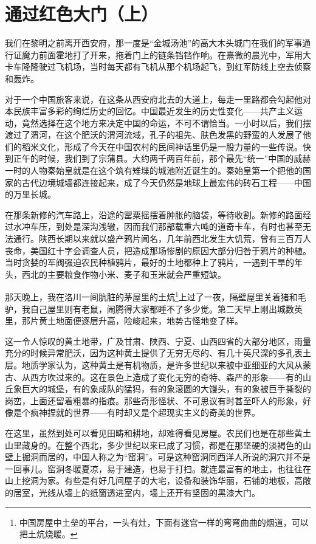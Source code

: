 \documentclass[10pt]{book}
\begin{document}
\section{通过红色大门（上）}

我们在黎明之前离开西安府，那一度是“金城汤池”的高大木头城门在我们的军事通行证魔力前面霍地打了开来，拖着门上的链条铛铛作响。在熹微的晨光中，军用大卡车隆隆驶过飞机场，当时每天都有飞机从那个机场起飞，到红军防线上空去侦察和轰炸。

对于一个中国旅客来说，在这条从西安府北去的大道上，每走一里路都会勾起他对本民族丰富多彩的绚烂历史的回忆。中国最近发生的历史性变化——共产主义运动，竟然选择在这个地方来决定中国的命运，不可不谓恰当。一小时以后，我们摆渡过了渭河，在这个肥沃的渭河流域，孔子的祖先、肤色发黑的野蛮的人发展了他们的稻米文化，形成了今天在中国农村的民间神话里仍是一股力量的一些传说。快到正午的时候，我们到了宗蒲县。大约两千两百年前，那个最先“统一”中国的威赫一时的人物秦始皇就是在这个筑有雉堞的城池附近诞生的。秦始皇第一个把他的国家的古代边境城墙都连接起来，成了今天仍然是地球上最宏伟的砖石工程——中国的万里长城。

在那条新修的汽车路上，沿途的罂粟摇摆着肿胀的脑袋，等待收割。新修的路面经过水冲车压，到处是深沟浅辙，因而我们那部载重六吨的道奇卡车，有时也甚至无法通行。陕西长期以来就以盛产鸦片闻名，几年前西北发生大饥荒，曾有三百万人丧命，美国红十字会调查人员，把造成那场惨剧的原因大部分归咎于鸦片的种植。当时贪婪的军阀强迫农民种植鸦片，最好的土地都种上了鸦片，一遇到干旱的年头，西北的主要粮食作物小米、麦子和玉米就会严重短缺。

那天晚上，我在洛川一间肮脏的茅屋里的土炕\footnote{中国房屋中土垒的平台，一头有灶，下面有迷宫一样的弯弯曲曲的烟道，可以把土炕烧暖。}上过了一夜，隔壁屋里关着猪和毛驴，我自己屋里则有老鼠，闹腾得大家都睡不了多少觉。第二天早上刚出城数英里，那片黄土地面便逐层升高，险峻起来，地势古怪地变了样。

这一令人惊叹的黄土地带，广及甘肃、陕西、宁夏、山西四省的大部分地区，雨量充分的时候异常肥沃，因为这种黄土提供了无穷无尽的、有几十英尺深的多孔表土层。地质学家认为，这种黄土是有机物质，是许多世纪以来被中亚细亚的大风从蒙古、从西方吹过来的。这在景色上造成了变化无穷的奇特、森严的形象——有的山丘象巨大的城堡，有的象成队的猛犸，有的象滚圆的大馒头，有的象被巨手撕裂的岗峦，上面还留着粗暴的指痕。那些奇形怪状、不可思议有时甚至吓人的形象，好像是个疯神捏就的世界——有时却又是个超现实主义的奇美的世界。

在这里，虽然到处可以看见田畴和耕地，却难得看见房屋。农民们也是在那些黄土山里藏身的。在整个西北，多少世纪以来已成了习惯，都是在那坚硬的淡褐色的山壁上掘洞而居的，中国人称之为“窑洞”。可是这种窑洞同西洋人所说的洞穴并不是一回事儿。窑洞冬暖夏凉，易于建造，也易于打扫。就连最富有的地主，也往往在山上挖洞为家。有些是有好几间屋子的大宅，设备和装饰华丽，石铺的地板，高敞的居室，光线从墙上的纸窗透进室内，墙上还开有坚固的黑漆大门。
\end{document}
